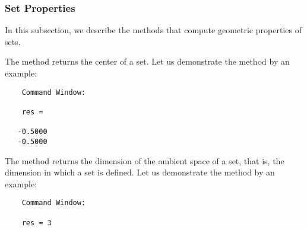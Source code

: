 \subsubsection{Set Properties}

In this subsection, we describe the methods that compute geometric properties of sets.


The method  returns the center of a set. Let us demonstrate the method  by an example:

\begin{center}
\begin{minipage}[t]{0.4\textwidth}
	\vspace{10pt}
	\footnotesize
	
\end{minipage}
\begin{minipage}[t]{0.2\textwidth}
	\vspace{10pt}

	\begin{verbatim}
	Command Window:
		
	res =

   -0.5000
   -0.5000
	\end{verbatim}
\end{minipage}
\begin{minipage}[t]{0.3\textwidth}
	\vspace{0pt}
	\centering
\end{minipage}
\end{center}



The method  returns the dimension of the ambient space of a set, that is, the dimension in which a set is defined. Let us demonstrate the method  by an example:

\begin{center}
\begin{minipage}[t]{0.40\textwidth}
	\vspace{10pt}
	\footnotesize
	
\end{minipage}
\begin{minipage}[t]{0.25\textwidth}
	\vspace{10pt}

	\begin{verbatim}	
	Command Window:
	
	res = 3
	\end{verbatim}
\end{minipage}
\end{center}


